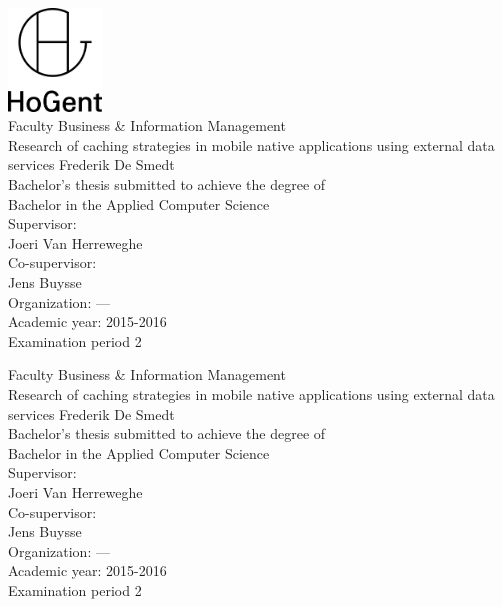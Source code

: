 \documentclass[pdftex,a4paper,12pt,twoside]{report}
\newcommand{\emptypage}{
\newpage
\thispagestyle{empty}
\mbox{}
\newpage
}
\newcommand{\student}{Frederik De Smedt}
\newcommand{\promotor}{Joeri Van Herreweghe}
\newcommand{\copromotor}{Jens Buysse}
\newcommand{\instelling}{---}
\newcommand{\titel}{Research of caching strategies in mobile native applications using external data services}
\newcommand{\faculteit}{Faculty Business \& Information Management}
\newcommand{\rapporttype}{Bachelor's thesis submitted to achieve the degree of\\Bachelor in the Applied Computer Science}
\newcommand{\academiejaar}{2015-2016}
\newcommand{\examenperiode}{Examination period 2}
\begin{document}

\begin{titlepage}
  \begin{center}

    \begingroup
    \rmfamily
    \includegraphics[width=2.5cm]{img/HG-beeldmerk-woordmerk}\\[.5cm]
    \faculteit\\[3cm]
    \titel
    \vfill
    \student\\[3.5cm]
    \rapporttype\\[2cm]
    Supervisor:\\
    \promotor\\
    Co-supervisor:\\
    \copromotor\\[2.5cm]
    Organization: \instelling\\[.5cm]
    Academic year: \academiejaar\\[.5cm]
    \examenperiode
    \endgroup

  \end{center}
  \restoregeometry
\end{titlepage}


\emptypage


\begin{titlepage}
  \begin{center}

    \begingroup
    \rmfamily
    \faculteit\\[3cm]
    \titel
    \vfill
    \student\\[3.5cm]
    \rapporttype\\[2cm]
    Supervisor:\\
    \promotor\\
    Co-supervisor:\\
    \copromotor\\[2.5cm]
    Organization: \instelling\\[.5cm]
    Academic year: \academiejaar\\[.5cm]
    \examenperiode
    \endgroup

  \end{center}
  \restoregeometry
\end{titlepage}
\end{document}
